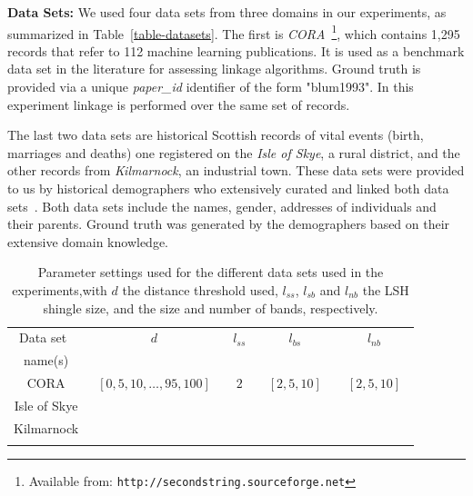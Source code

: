 \documentclass{llncs}
\begin{document}
\smallskip
\textbf{Data Sets:}
We used four data sets from three domains in our experiments, as
summarized in Table~\ref{table-datasets}. The first is
\emph{CORA}~\footnote{Available from:
\texttt{http://secondstring.sourceforge.net}}, which contains 1,295
records that refer to 112 machine learning publications. 
It is used as a benchmark data set in the literature for assessing linkage algorithms. Ground truth is provided via a unique
\emph{paper\_id} identifier of the form "blum1993". In this experiment linkage is performed over the same set of records.

The last two data sets are historical Scottish records of vital
events (birth, marriages and deaths) one registered on the
\emph{Isle of Skye}, a rural district, and the other
records from \emph{Kilmarnock}, an industrial town. These data sets
were provided to us by historical demographers who extensively
curated and linked both data sets~\cite{reid2002,reid2006}. Both data
sets include the  names, gender, addresses of individuals and their
parents. Ground truth was generated by the demographers based on their
extensive domain knowledge.


\begin{table}[t]
\caption{Parameter settings used for the different data sets used in
   the experiments,with $d$ the distance threshold used, $l_{ss}$, $l_{sb}$ and $l_{nb}$ the LSH
   shingle size, and the size and number of bands, respectively.}
 \label{table-parameters}
  \centering
  \begin{scriptsize}
  \begin{tabular}{ccccc}
  \hline\noalign{\smallskip}
  Data set~ & $d$ & $l_{ss}$ & $l_{bs}$ & $l_{nb}$ \\
  name(s) & & & &  \\
  \noalign{\smallskip} \hline \noalign{\smallskip}
  CORA & ~$[0,5,10,\ldots,95,100]$~ & ~$2$~ &
    ~$[2,5,10]$~ & ~$[2,5,10]$~  \\
  Isle of Skye &  \\
  Kilmarnock  &  \\
  \noalign{\smallskip} \hline
  \end{tabular}
  \end{scriptsize}
\end{table}

\end{document}
